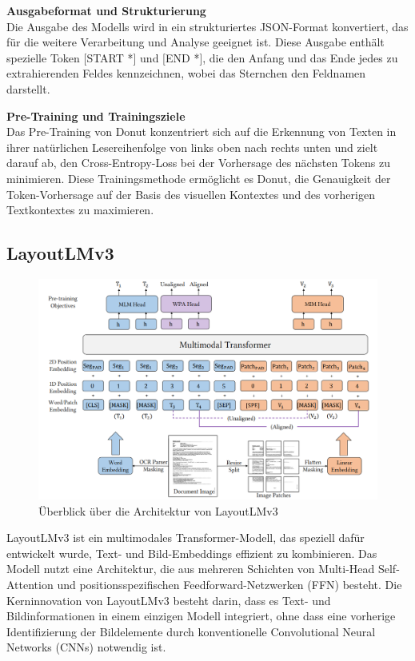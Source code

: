 \documentclass[12pt,a4paper,twoside]{article}
\begin{document}
\textbf{Ausgabeformat und Strukturierung}\\
Die Ausgabe des Modells wird in ein strukturiertes JSON-Format konvertiert, das für die weitere Verarbeitung und Analyse geeignet ist. Diese Ausgabe enthält spezielle Token [START *] und [END *], die den Anfang und das Ende jedes zu extrahierenden Feldes kennzeichnen, wobei das Sternchen den Feldnamen darstellt.

\textbf{Pre-Training und Trainingsziele}\\
Das Pre-Training von Donut konzentriert sich auf die Erkennung von Texten in ihrer natürlichen Lesereihenfolge von links oben nach rechts unten und zielt darauf ab, den Cross-Entropy-Loss bei der Vorhersage des nächsten Tokens zu minimieren. Diese Trainingsmethode ermöglicht es Donut, die Genauigkeit der Token-Vorhersage auf der Basis des visuellen Kontextes und des vorherigen Textkontextes zu maximieren.

\cite{Donut-Paper}
\subsection{LayoutLMv3}

\begin{figure}[H]
    \centering
    \includegraphics[width=0.8\linewidth]{LAYOUTLMV3-Architektur-Ueberblick.png}
    \caption{Überblick über die Architektur von LayoutLMv3}
    \label{fig:layoutlmv3-arch}
\end{figure}

LayoutLMv3 ist ein multimodales Transformer-Modell, das speziell dafür entwickelt wurde, Text- und Bild-Embeddings effizient zu kombinieren. Das Modell nutzt eine Architektur, die aus mehreren Schichten von Multi-Head Self-Attention und positionsspezifischen Feedforward-Netzwerken (FFN) besteht. Die Kerninnovation von LayoutLMv3 besteht darin, dass es Text- und Bildinformationen in einem einzigen Modell integriert, ohne dass eine vorherige Identifizierung der Bildelemente durch konventionelle Convolutional Neural Networks (CNNs) notwendig ist.
\end{document}
